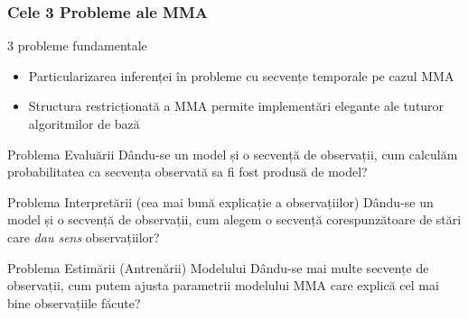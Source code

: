 \begin{frame}
  \frametitle{Cele 3 Probleme ale MMA}
  \small{  
  3 probleme fundamentale \citep{rabiner1989tutorial}
  \begin{itemize}
	\item Particularizarea inferenței în probleme cu secvențe temporale pe cazul MMA
  	\item Structura restricționată a MMA permite implementări elegante ale tuturor algoritmilor de bază
  \end{itemize}
  }
  \pause

  \begin{block}{Problema Evaluării}
  	Dându-se un model și o secvență de observații, cum calculăm probabilitatea ca \alert{secvența observată} sa fi
  	fost produsă de model?
  \end{block}
  \pause
  
  \begin{block}{Problema Interpretării (cea mai bună explicație a observațiilor)}
  	Dându-se un model și o secvență de observații, cum alegem o \alert{secvență corespunzătoare de stări} care
  	\emph{dau sens} observațiilor?
  \end{block}
  \pause
  
  \begin{block}{Problema Estimării (Antrenării) Modelului}
	Dându-se mai multe secvențe de observații, cum putem ajusta \alert{parametrii modelului MMA} care explică cel 
	mai bine observațiile făcute?
  \end{block}

\end{frame}